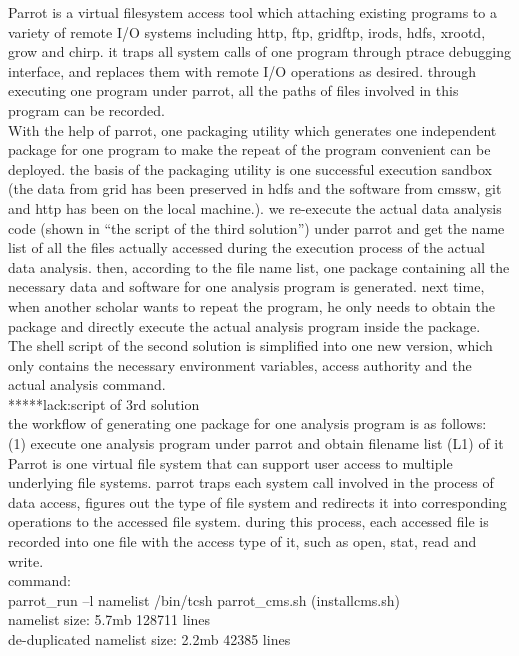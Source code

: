 \documentclass{article}
\begin{document}
Parrot is a virtual filesystem access tool which attaching existing programs to a variety of remote I/O systems including http, ftp, gridftp, irods, hdfs, xrootd, grow and chirp. it traps all system calls of one program through ptrace debugging interface, and replaces them with remote I/O operations as desired. through executing one program under parrot, all the paths of files involved in this program can be recorded.\\

With the help of parrot, one packaging utility which generates one independent package for one program to make the repeat of the program convenient can be deployed. the basis of the packaging utility is one successful execution sandbox (the data from grid has been preserved in hdfs and the software from cmssw, git and http has been on the local machine.). we re-execute the actual data analysis code (shown in “the script of the third solution”) under parrot and get the name list of all the files actually accessed during the execution process of the actual data analysis. then, according to the file name list, one package containing all the necessary data and software for one analysis program is generated. next time, when another scholar wants to repeat the program, he only needs to obtain the package and directly execute the actual analysis program inside the package.\\

The shell script of the second solution is simplified into one new version, which only contains the necessary environment variables, access authority and the actual analysis command.\\

*****lack:script of 3rd solution\\

the workflow of generating one package for one analysis program  is as follows: \\
\indent (1) execute one analysis program under parrot and obtain filename list (L1) of it\\
\indent Parrot is one virtual file system that can support user access to multiple underlying file systems. parrot traps each system call involved in the process of data access, figures out the type of file system and redirects it into corresponding operations to the accessed file system. during this process, each accessed file is recorded into one file with the access type of it, such as open, stat, read and write.\\
\indent command:\\
\indent parrot\_run –l namelist /bin/tcsh parrot\_cms.sh (installcms.sh)\\
\indent namelist size: 5.7mb     128711 lines\\
\indent de-duplicated namelist size: 2.2mb   42385 lines\\
\end{document}
